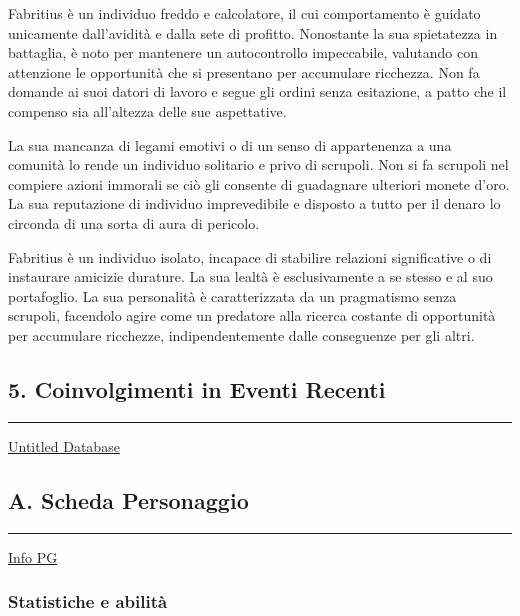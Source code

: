 Fabritius è un individuo freddo e calcolatore, il cui comportamento è
guidato unicamente dall'avidità e dalla sete di profitto. Nonostante la
sua spietatezza in battaglia, è noto per mantenere un autocontrollo
impeccabile, valutando con attenzione le opportunità che si presentano
per accumulare ricchezza. Non fa domande ai suoi datori di lavoro e
segue gli ordini senza esitazione, a patto che il compenso sia
all'altezza delle sue aspettative.

La sua mancanza di legami emotivi o di un senso di appartenenza a una
comunità lo rende un individuo solitario e privo di scrupoli. Non si fa
scrupoli nel compiere azioni immorali se ciò gli consente di guadagnare
ulteriori monete d'oro. La sua reputazione di individuo imprevedibile e
disposto a tutto per il denaro lo circonda di una sorta di aura di
pericolo.

Fabritius è un individuo isolato, incapace di stabilire relazioni
significative o di instaurare amicizie durature. La sua lealtà è
esclusivamente a se stesso e al suo portafoglio. La sua personalità è
caratterizzata da un pragmatismo senza scrupoli, facendolo agire come un
predatore alla ricerca costante di opportunità per accumulare ricchezze,
indipendentemente dalle conseguenze per gli altri.

\subsection{5. Coinvolgimenti in Eventi
Recenti}\label{coinvolgimenti-in-eventi-recenti}

\begin{center}\rule{0.5\linewidth}{0.5pt}\end{center}

\href{Untitled\%20Database\%20cce7df74e0604fb88db6fb1d13af3934.csv}{Untitled
Database}

\subsection{A. Scheda Personaggio}\label{a.-scheda-personaggio}

\begin{center}\rule{0.5\linewidth}{0.5pt}\end{center}

\href{Info\%20PG\%20fb7eb7ba722a44cc9fb01c89ea57ab55.csv}{Info PG}

\subsubsection{Statistiche e abilità}\label{statistiche-e-abilituxe0}

